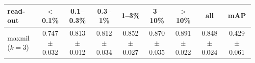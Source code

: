 \begin{tabular}{lcccccccc}
\toprule
read-out & $<$0.1\% & 0.1--0.3\% & 0.3--1\% & 1--3\% & 3--10\% & $>$10\% & all & mAP \\
\midrule
maxmil ($k=3$) & 0.747 $\pm$ 0.032 & 0.813 $\pm$ 0.012 & 0.812 $\pm$ 0.034 & 0.852 $\pm$ 0.027 & 0.870 $\pm$ 0.035 & 0.891 $\pm$ 0.022 & 0.848 $\pm$ 0.024 & 0.429 $\pm$ 0.061 \\
\bottomrule
\end{tabular}
